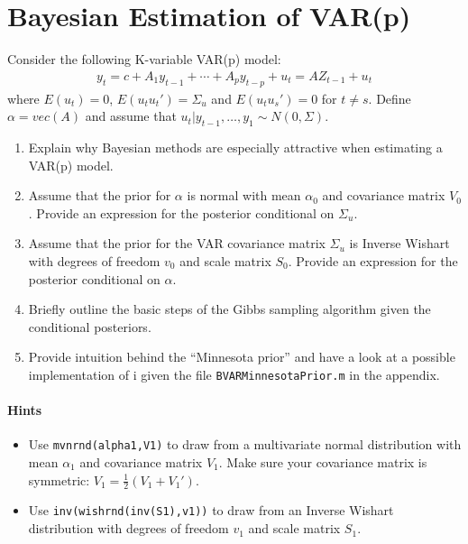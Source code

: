 \section[Bayesian Estimation of VAR{(p)}]{Bayesian Estimation of VAR{(p)}\label{ex:BayesianEstimationVARp}}
Consider the following K-variable VAR{(p)} model:
\begin{align*}
y_t = c + A_1 y_{t-1} + \cdots + A_p y_{t-p} + u_t= AZ_{t-1} + u_t
\end{align*}
where \(E(u_t)=0\), \(E(u_t u_t')=\Sigma_{u}\) and \(E(u_t u_s')=0\) for \(t\neq s\).
Define \(\alpha = vec(A)\) and assume that \(u_t|y_{t-1},\ldots ,y_1\sim N(0,\Sigma)\).

\begin{enumerate}

\item
Explain why Bayesian methods are especially attractive when estimating a VAR{(p)} model.

\item
Assume that the prior for \(\alpha \) is normal with mean \(\alpha_0\) and covariance matrix \(V_0\).
Provide an expression for the posterior conditional on \(\Sigma_u\).

\item
Assume that the prior for the VAR covariance matrix \(\Sigma_u\) is Inverse Wishart
  with degrees of freedom \(v_0\) and scale matrix \(S_0\).
Provide an expression for the posterior conditional on \(\alpha \).

\item
Briefly outline the basic steps of the Gibbs sampling algorithm given the conditional posteriors.

\item
Provide intuition behind the \enquote{Minnesota prior}
  and have a look at a possible implementation of i
  given the file \texttt{BVARMinnesotaPrior.m} in the appendix.
\end{enumerate}

\paragraph{Hints}
\begin{itemize}
\item Use \texttt{mvnrnd(alpha1,V1)} to draw from a multivariate normal distribution with mean \(\alpha_1\) and covariance matrix \(V_1\).
Make sure your covariance matrix is symmetric: \(V_1 = \frac{1}{2}(V_1+V_1')\).
\item Use \texttt{inv(wishrnd(inv(S1),v1))} to draw from an Inverse Wishart distribution with degrees of freedom \(v_1\) and scale matrix \(S_1\).
\end{itemize}

